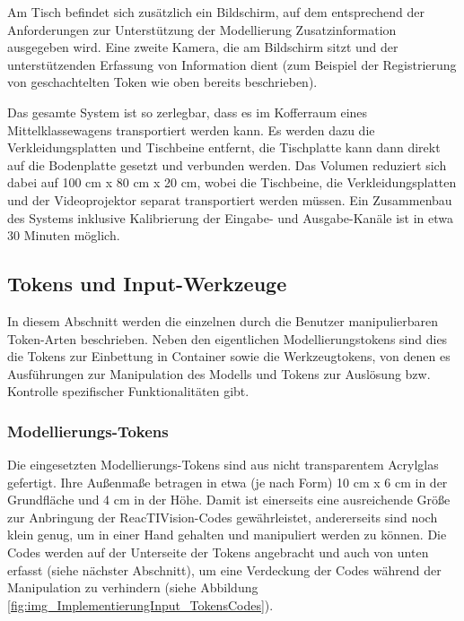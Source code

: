 Am Tisch befindet sich zusätzlich ein Bildschirm, auf dem entsprechend der Anforderungen zur Unterstützung der Modellierung Zusatzinformation ausgegeben wird. Eine zweite Kamera, die am Bildschirm sitzt und der unterstützenden Erfassung von Information dient (zum Beispiel der Registrierung von geschachtelten Token wie oben bereits beschrieben).

Das gesamte System ist so zerlegbar, dass es im Kofferraum eines Mittelklassewagens transportiert werden kann. Es werden dazu die Verkleidungsplatten und Tischbeine entfernt, die Tischplatte kann dann direkt auf die Bodenplatte gesetzt und verbunden werden. Das Volumen reduziert sich dabei auf 100 cm x 80 cm x 20 cm, wobei die Tischbeine, die Verkleidungsplatten und der Videoprojektor separat transportiert werden müssen. Ein Zusammenbau des Systems inklusive Kalibrierung der Eingabe- und Ausgabe-Kanäle ist in etwa 30 Minuten möglich.


\subsection{Tokens und Input-Werkzeuge} %
\label{sub:tokens_&_input_werkzeuge}

In diesem Abschnitt werden die einzelnen durch die Benutzer manipulierbaren Token-Arten beschrieben. Neben den eigentlichen Modellierungstokens sind dies die Tokens zur Einbettung in Container sowie die Werkzeugtokens, von denen es Ausführungen zur Manipulation des Modells und Tokens zur Auslösung bzw. Kontrolle spezifischer Funktionalitäten gibt.

\subsubsection{Modellierungs-Tokens} %
\label{subs:modellierungs_tokens}

Die eingesetzten Modellierungs-Tokens sind aus nicht transparentem Acrylglas gefertigt. Ihre Außenmaße betragen in etwa (je nach Form) 10 cm x 6 cm in der Grundfläche und 4 cm in der Höhe. Damit ist einerseits eine ausreichende Größe zur Anbringung der ReacTIVision-Codes gewährleistet, andererseits sind noch klein genug, um in einer Hand gehalten und manipuliert werden zu können. Die Codes werden auf der Unterseite der Tokens angebracht und auch von unten erfasst (siehe nächster Abschnitt), um eine Verdeckung der Codes während der Manipulation zu verhindern (siehe Abbildung \ref{fig:img_ImplementierungInput_TokensCodes}).

